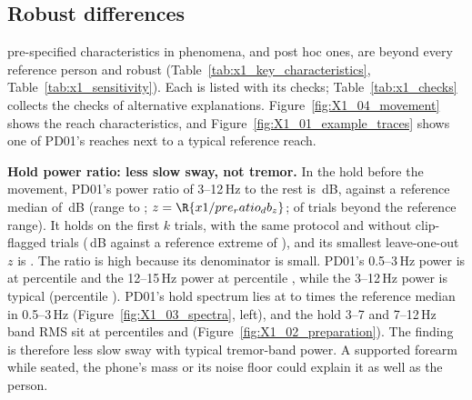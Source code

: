 
\FloatBarrier
\subsection{Robust differences}\label{app:pd01:robust}

 pre-specified characteristics in  phenomena, and  post hoc ones, are beyond every reference person and robust (Table~\ref{tab:x1_key_characteristics}, Table~\ref{tab:x1_sensitivity}).
Each is listed with its checks; Table~\ref{tab:x1_checks} collects the checks of alternative explanations.
Figure~\ref{fig:X1_04_movement} shows the reach characteristics, and Figure~\ref{fig:X1_01_example_traces} shows one of PD01's reaches next to a typical reference reach.

\textbf{Hold power ratio: less slow sway, not tremor.}
In the hold before the movement, PD01's power ratio of 3--12\,Hz to the rest is \,dB, against a reference median of \,dB (range  to ; $z = \R{x1/pre_ratio_db_z}$;  of  trials beyond the reference range).
It holds on the first $k$ trials, with the same protocol and without clip-flagged trials (\,dB against a reference extreme of ), and its smallest leave-one-out $z$ is .
The ratio is high because its denominator is small.
PD01's 0.5--3\,Hz power is at percentile  and the 12--15\,Hz power at percentile , while the 3--12\,Hz power is typical (percentile ).
PD01's hold spectrum lies at  to  times the reference median in 0.5--3\,Hz (Figure~\ref{fig:X1_03_spectra}, left), and the hold 3--7 and 7--12\,Hz band RMS sit at percentiles  and  (Figure~\ref{fig:X1_02_preparation}).
The finding is therefore less slow sway with typical tremor-band power.
A supported forearm while seated, the phone's mass or its noise floor could explain it as well as the person.

